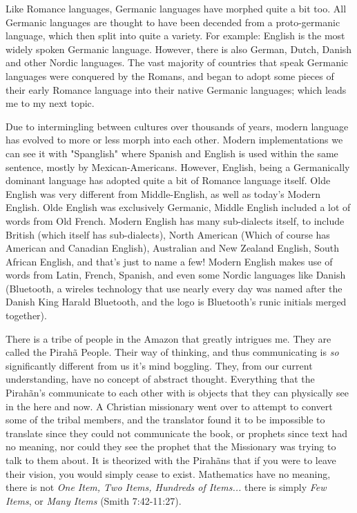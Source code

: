 \documentclass[12pt]{article}
\begin{document}
\par
Like Romance languages, Germanic languages have morphed quite a bit too. All Germanic languages are thought to have been decended from a proto-germanic language, which then split into quite a variety. For example: English is the most widely spoken Germanic language. However, there is also German, Dutch, Danish and other Nordic languages. The vast majority of countries that speak Germanic languages were conquered by the Romans, and began to adopt some pieces of their early Romance language into their native Germanic languages; which leads me to my next topic.
\par
Due to intermingling between cultures over thousands of years, modern language has evolved to more or less morph into each other. Modern implementations we can see it with "Spanglish" where Spanish and English is used within the same sentence, mostly by Mexican-Americans. However, English, being a Germanically dominant language has adopted quite a bit of Romance language itself. Olde English was very different from Middle-English, as well as today's Modern English. Olde English was exclusively Germanic, Middle English included a lot of words from Old French. Modern English has many sub-dialects itself, to include British (which itself has sub-dialects), North American (Which of course has American and Canadian English), Australian and New Zealand English, South African English, and that's just to name a few! Modern English makes use of words from Latin, French, Spanish, and even some Nordic languages like Danish (Bluetooth, a wireles technology that use nearly every day was named after the Danish King Harald Bluetooth, and the logo is Bluetooth's runic initials merged together).
\par
There is a tribe of people in the Amazon that greatly intrigues me. They are called the Pirah\~{a} People. Their way of thinking, and thus communicating is \emph{so} significantly different from us it's mind boggling. They, from our current understanding, have no concept of abstract thought. Everything that the Pirah\~{a}n's communicate to each other with is objects that they can physically see in the here and now. A Christian missionary went over to attempt to convert some of the tribal members, and the translator found it to be impossible to translate since they could not communicate the book, or prophets since text had no meaning, nor could they see the prophet that the Missionary was trying to talk to them about. It is theorized with the Pirah\~{a}ns that if you were to leave their vision, you would simply cease to exist. Mathematics have no meaning, there is not \emph{One Item, Two Items, Hundreds of Items...} there is simply \emph{Few Items}, or \emph{Many Items} (Smith 7:42-11:27).
\par
\end{document}
